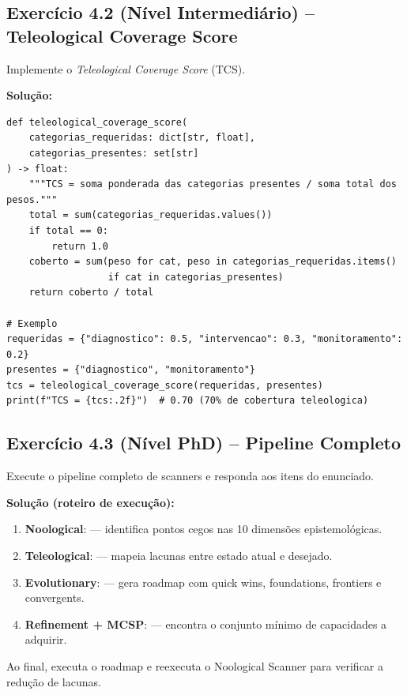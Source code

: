 \subsection*{Exercício 4.2 (Nível Intermediário) -- Teleological Coverage Score}
Implemente o \emph{Teleological Coverage Score} (TCS).

\textbf{Solução:}
\begin{lstlisting}[style=pythonstyle]
def teleological_coverage_score(
    categorias_requeridas: dict[str, float],
    categorias_presentes: set[str]
) -> float:
    """TCS = soma ponderada das categorias presentes / soma total dos pesos."""
    total = sum(categorias_requeridas.values())
    if total == 0:
        return 1.0
    coberto = sum(peso for cat, peso in categorias_requeridas.items()
                  if cat in categorias_presentes)
    return coberto / total

# Exemplo
requeridas = {"diagnostico": 0.5, "intervencao": 0.3, "monitoramento": 0.2}
presentes = {"diagnostico", "monitoramento"}
tcs = teleological_coverage_score(requeridas, presentes)
print(f"TCS = {tcs:.2f}")  # 0.70 (70% de cobertura teleologica)
\end{lstlisting}

\subsection*{Exercício 4.3 (Nível PhD) -- Pipeline Completo}
Execute o pipeline completo de scanners e responda aos itens do enunciado.

\textbf{Solução (roteiro de execução):}
\begin{enumerate}
\item \textbf{Noological}:  --- identifica pontos cegos
      nas 10 dimensões epistemológicas.
\item \textbf{Teleological}: 
      --- mapeia lacunas entre estado atual e desejado.
\item \textbf{Evolutionary}:  --- gera roadmap
      com quick wins, foundations, frontiers e convergents.
\item \textbf{Refinement + MCSP}:  --- encontra o
      conjunto mínimo de capacidades a adquirir.
\end{enumerate}

Ao final,  executa o roadmap e reexecuta o Noological
Scanner para verificar a redução de lacunas.

